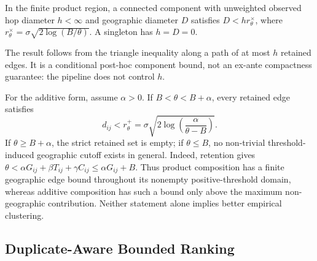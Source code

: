 \documentclass[runningheads]{llncs}
\begin{document}
\begin{corollary}
In the finite product region, a connected component with unweighted observed
hop diameter $h<\infty$ and geographic diameter $D$ satisfies
$D<hr_\theta^\times$, where
$r_\theta^\times=\sigma\sqrt{2\log(B/\theta)}$. A singleton has $h=D=0$.
\end{corollary}
The result follows from the triangle inequality along a path of at most $h$
retained edges. It is a conditional post-hoc component bound, not an ex-ante
compactness guarantee: the pipeline does not control $h$.

For the additive form, assume $\alpha>0$. If
$B<\theta<B+\alpha$, every retained edge satisfies
\[
d_{ij}<r_\theta^+
=\sigma\sqrt{2\log\!\left(\frac{\alpha}{\theta-B}\right)}.
\]
If $\theta\ge B+\alpha$, the strict retained set is empty; if
$\theta\le B$, no non-trivial threshold-induced geographic cutoff exists in
general. Indeed, retention gives
$\theta<\alpha G_{ij}+\beta T_{ij}+\gamma C_{ij}\le\alpha G_{ij}+B$.
Thus product composition has a finite geographic edge bound throughout its
nonempty positive-threshold domain, whereas additive composition has such a
bound only above the maximum non-geographic contribution. Neither statement
alone implies better empirical clustering.

\subsection{Duplicate-Aware Bounded Ranking}
\end{document}
